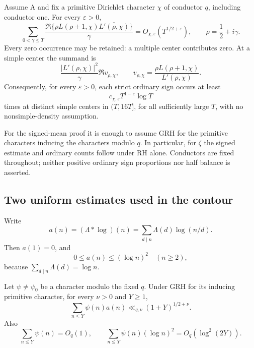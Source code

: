 \begin{theorem}
\label{thm:A046-dirichlet-signed}
Assume A and fix a primitive Dirichlet character \(\chi\) of
conductor \(q\), including conductor one. For every
\(\varepsilon>0\),
\begin{equation}\label{eq:A046-signed-mean}
 \sum_{0<\gamma\le T}
  \frac{\Re\{\rho L(\rho+1,\chi)
                    \overline{L'(\rho,\chi)}\}}{\gamma}
                       =O_{\chi,\varepsilon}(T^{1/2+\varepsilon}),
 \qquad \rho=\frac12+i\gamma.
\end{equation}
Every zero occurrence may be retained: a multiple center
contributes zero. At a simple center the summand is
\[
             \frac{|L'(\rho,\chi)|^2}{\gamma}\Re v_{\rho,\chi},
 \qquad
             v_{\rho,\chi}=\frac{\rho L(\rho+1,\chi)}{L'(\rho,\chi)}.
\]
Consequently, for every \(\varepsilon>0\), each strict
ordinary sign occurs at least
\[
                         c_{\chi,\varepsilon}
                                  T^{1-\varepsilon}\log T
\]
times at distinct simple centers in \((T,16T]\), for all
sufficiently large \(T\), with no nonsimple-density assumption.

For the signed-mean proof it is enough to assume GRH for the
primitive characters inducing the characters modulo \(q\).
In particular, for \(\zeta\) the signed estimate and ordinary
counts follow under RH alone. Conductors are fixed throughout;
neither positive ordinary sign proportions nor half balance
is asserted.
\end{theorem}

\subsection{Two uniform estimates used in the contour}

Write
\[
 a(n)=(\Lambda*\log)(n)
        =\sum_{d\mid n}\Lambda(d)\log(n/d).
\]
Then \(a(1)=0\), and
\begin{equation}\label{eq:A046-coefficients}
             0\le a(n)\le(\log n)^2\quad(n\ge2),
\end{equation}
because \(\sum_{d\mid n}\Lambda(d)=\log n\).

\begin{lemma}
\label{lem:A046-convolution}
Let \(\psi\ne\psi_0\) be a character modulo the fixed \(q\).
Under GRH for its inducing primitive character, for every
\(\nu>0\) and \(Y\ge1\),
\[
             \sum_{n\le Y}\psi(n)a(n)
                          \ll_{q,\nu}(1+Y)^{1/2+\nu}.
\]
Also
\[
 \sum_{n\le Y}\psi(n)=O_q(1),\qquad
 \sum_{n\le Y}\psi(n)(\log n)^2=O_q(\log^2(2Y)).
\]
\end{lemma}

